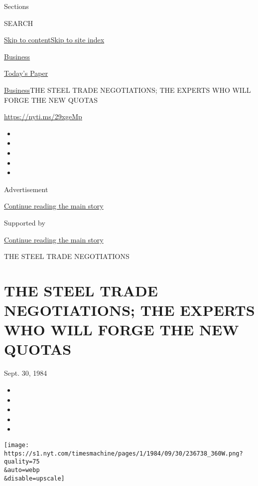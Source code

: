 Sections

SEARCH

\protect\hyperlink{site-content}{Skip to
content}\protect\hyperlink{site-index}{Skip to site index}

\href{https://www.nytimes.com/section/business}{Business}

\href{https://myaccount.nytimes.com/auth/login?response_type=cookie\&client_id=vi}{}

\href{https://www.nytimes.com/section/todayspaper}{Today's Paper}

\href{/section/business}{Business}\textbar{}THE STEEL TRADE
NEGOTIATIONS; THE EXPERTS WHO WILL FORGE THE NEW QUOTAS

\url{https://nyti.ms/29xgeMp}

\begin{itemize}
\item
\item
\item
\item
\item
\end{itemize}

Advertisement

\protect\hyperlink{after-top}{Continue reading the main story}

Supported by

\protect\hyperlink{after-sponsor}{Continue reading the main story}

THE STEEL TRADE NEGOTIATIONS

\hypertarget{the-steel-trade-negotiations-the-experts-who-will-forge-the-new-quotas}{%
\section{THE STEEL TRADE NEGOTIATIONS; THE EXPERTS WHO WILL FORGE THE
NEW
QUOTAS}\label{the-steel-trade-negotiations-the-experts-who-will-forge-the-new-quotas}}

Sept. 30, 1984

\begin{itemize}
\item
\item
\item
\item
\item
\end{itemize}

\texttt{[image: https://s1.nyt.com/timesmachine/pages/1/1984/09/30/236738\_360W.png?quality=75\\\&auto=webp\\\&disable=upscale]}

